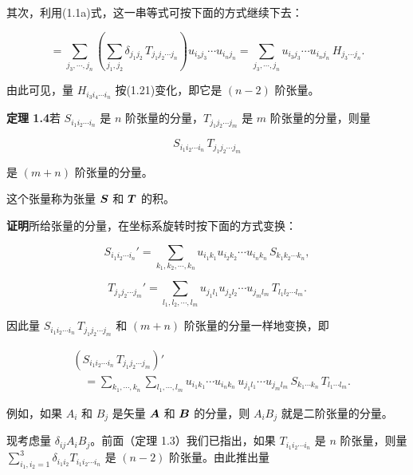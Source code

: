 其次，利用(1.1a)式，这一串等式可按下面的方式继续下去：

\begin{equation*}
= \sum_{j_3, \cdots, j_n} \left(\sum_{j_1, j_2} \delta_{j_1 j_2}\, T_{j_1 j_2 \cdots j_n}\right) u_{i_3 j_3} \cdots u_{i_n j_n}
= \sum_{j_3, \cdots, j_n} u_{i_3 j_3} \cdots u_{i_n j_n}\, H_{j_3 \cdots j_n}.
\end{equation*}

由此可见，量 $H_{i_3 i_4 \cdots i_n}$ 按(1.21)变化，即它是 $(n - 2)$ 阶张量。

\textbf{定理 1.4}\quad 若 $S_{i_1 i_2 \cdots i_n}$ 是 $n$ 阶张量的分量，$T_{j_1 j_2 \cdots j_m}$ 是 $m$ 阶张量的分量，则量

\begin{equation*}
S_{i_1 i_2 \cdots i_n}\, T_{j_1 j_2 \cdots j_m}
\end{equation*}

是 $(m + n)$ 阶张量的分量。

这个张量称为张量 $\bm{S}$ 和 $\bm{T}$ 的积。

\textbf{证明}\quad 所给张量的分量，在坐标系旋转时按下面的方式变换：

\begin{equation*}
S_{i_1 i_2 \cdots i_n}' = \sum_{k_1, k_2, \cdots, k_n} u_{i_1 k_1} u_{i_2 k_2} \cdots u_{i_n k_n}\, S_{k_1 k_2 \cdots k_n},
\end{equation*}

\begin{equation*}
T_{j_1 j_2 \cdots j_m}' = \sum_{l_1, l_2, \cdots, l_m} u_{j_1 l_1} u_{j_2 l_2} \cdots u_{j_m l_m}\, T_{l_1 l_2 \cdots l_m}.
\end{equation*}

因此量 $S_{i_1 i_2 \cdots i_n}\, T_{j_1 j_2 \cdots j_m}$ 和 $(m + n)$ 阶张量的分量一样地变换，即

\begin{equation*}
\begin{aligned}
&(S_{i_1 i_2 \cdots i_n}\, T_{j_1 j_2 \cdots j_m})'\\
&\quad = \sum_{k_1, \cdots, k_n} \sum_{l_1, \cdots, l_m} u_{i_1 k_1} \cdots u_{i_n k_n}\, u_{j_1 l_1} \cdots u_{j_m l_m}\, S_{k_1 \cdots k_n}\, T_{l_1 \cdots l_m}.
\end{aligned}
\end{equation*}

例如，如果 $A_i$ 和 $B_j$ 是矢量 $\bm{A}$ 和 $\bm{B}$ 的分量，则 $A_i B_j$ 就是二阶张量的分量。

现考虑量 $\delta_{ij} A_i B_j$。前面（定理 1.3）我们已指出，如果 $T_{i_1 i_2 \cdots i_n}$ 是 $n$ 阶张量，则量 $\sum_{i_1, i_2 = 1}^{3} \delta_{i_1 i_2} T_{i_1 i_2 \cdots i_n}$ 是 $(n - 2)$ 阶张量。由此推出量

